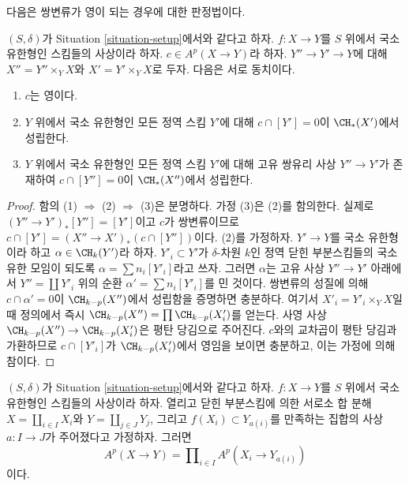 \noindent
다음은 쌍변류가 영이 되는 경우에 대한 판정법이다.

\begin{lemma}
\label{lemma-bivariant-zero}
$(S, \delta)$가 Situation \ref{situation-setup}에서와 같다고 하자.
$f : X \to Y$를 $S$ 위에서 국소 유한형인 스킴들의 사상이라 하자.
$c \in A^p(X \to Y)$라 하자. $Y'' \to Y' \to Y$에 대해
$X'' = Y'' \times_Y X$와 $X' = Y' \times_Y X$로 두자. 다음은 서로
동치이다.
\begin{enumerate}
\item $c$는 영이다.
\item $Y$ 위에서 국소 유한형인 모든 정역 스킴 $Y'$에 대해
$c \cap [Y'] = 0$이 $\CH_*(X')$에서 성립한다.
\item $Y$ 위에서 국소 유한형인 모든 정역 스킴 $Y'$에 대해 고유 쌍유리
사상 $Y'' \to Y'$가 존재하여 $c \cap [Y''] = 0$이
$\CH_*(X'')$에서 성립한다.
\end{enumerate}
\end{lemma}

\begin{proof}
함의 (1) $\Rightarrow$ (2) $\Rightarrow$ (3)은 분명하다.
가정 (3)은 (2)를 함의한다. 실제로
$(Y'' \to Y')_*[Y''] = [Y']$이고 $c$가 쌍변류이므로
$c \cap [Y'] = (X'' \to X')_*(c \cap [Y''])$이다. (2)를 가정하자.
$Y' \to Y$를 국소 유한형이라 하고 $\alpha \in \CH_k(Y')$라 하자.
$Y'_i \subset Y'$가 $\delta$-차원 $k$인 정역 닫힌 부분스킴들의 국소
유한 모임이 되도록 $\alpha = \sum n_i [Y'_i]$라고 쓰자. 그러면
$\alpha$는 고유 사상 $Y'' \to Y'$ 아래에서 $Y'' = \coprod Y'_i$ 위의
순환 $\alpha' = \sum n_i[Y'_i]$를 민 것이다. 쌍변류의 성질에 의해
$c \cap \alpha' = 0$이 $\CH_{k - p}(X'')$에서 성립함을 증명하면
충분하다. 여기서 $X'_i = Y'_i \times_Y X$일 때 정의에서 즉시
$\CH_{k - p}(X'') = \prod \CH_{k - p}(X'_i)$를 얻는다. 사영 사상
$\CH_{k - p}(X'') \to \CH_{k - p}(X'_i)$은 평탄 당김으로 주어진다.
$c$와의 교차곱이 평탄 당김과 가환하므로
$c \cap [Y'_i]$가 $\CH_{k - p}(X'_i)$에서 영임을 보이면 충분하고,
이는 가정에 의해 참이다.
\end{proof}

\begin{lemma}
\label{lemma-disjoint-decomposition-bivariant}
$(S, \delta)$가 Situation \ref{situation-setup}에서와 같다고 하자.
$f : X \to Y$를 $S$ 위에서 국소 유한형인 스킴들의 사상이라 하자.
열리고 닫힌 부분스킴에 의한 서로소 합 분해
$X = \coprod_{i \in I} X_i$와 $Y = \coprod_{j \in J} Y_j$, 그리고
$f(X_i) \subset Y_{a(i)}$를 만족하는 집합의 사상 $a : I \to J$가
주어졌다고 가정하자. 그러면
$$
A^p(X \to Y) = \prod\nolimits_{i \in I} A^p(X_i \to Y_{a(i)})
$$
이다.
\end{lemma}

